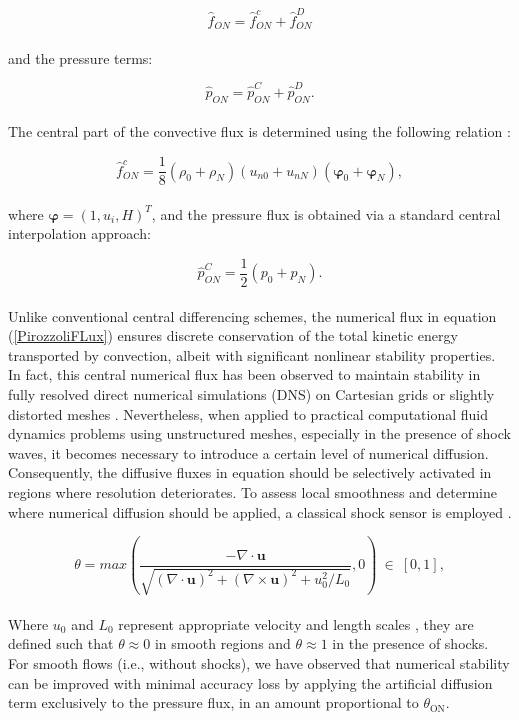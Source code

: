 \documentclass[a5paper]{sapthesis}
\begin{document}
	\begin{equation}
		\hat{f}_{ON} = \hat{f}^{c}_{ON} + \hat{f}^{D}_{ON}
		\label{convective_central_diffusive_fluxes}
	\end{equation}
	\\
	and the pressure terms:
	
	\begin{equation}
		\hat{p}_{ON} = \hat{p}^{C}_{ON} + \hat{p}^{D}_{ON}.
		\label{diffusive_central_diffusive_fluxes}
	\end{equation}
	\\
	The central part of the convective flux is determined using the following relation \cite{PIROZZOLI20107180}:
	
	\begin{equation}
		\hat{f}^{c}_{ON} = \frac{1}{8} (\rho_0 + \rho_N) (u_{n0} + u_{nN}) (\boldsymbol{\varphi}_0 + \boldsymbol{\varphi}_N),
		\label{PirozzoliFLux}
	\end{equation}
	\\
	where $\boldsymbol{\varphi} = (1, u_i, H)^T$, and the pressure flux is obtained via a standard central interpolation approach:
	
	\begin{equation}
		\hat{p}^{C}_{ON} = \frac{1}{2} (p_0 + p_N).
	\end{equation}
	\\
	Unlike conventional central differencing schemes, the numerical flux in equation (\ref{PirozzoliFLux}) ensures discrete conservation of the total kinetic energy transported by convection, albeit with significant nonlinear stability properties. In fact, this central numerical flux has been observed to maintain stability in fully resolved direct numerical simulations (DNS) on Cartesian grids or slightly distorted meshes \cite{PIROZZOLI20107180,PIROZZOLI20112997}. Nevertheless, when applied to practical computational fluid dynamics problems using unstructured meshes, especially in the presence of shock waves, it becomes necessary to introduce a certain level of numerical diffusion. Consequently, the diffusive fluxes in equation should be selectively activated in regions where resolution deteriorates. To assess local smoothness and determine where numerical diffusion should be applied, a classical shock sensor is employed \cite{DUCROS1999}.
	
	\begin{equation}
		\theta = max\left (\dfrac{-\nabla \cdot \mathbf{u}}{\sqrt{(\nabla \cdot \mathbf{u})^2 + (\nabla \times \mathbf{u})^2 + u_0^2/L_0}}, 0 \right ) \ \in \ [0,1],
	\end{equation}
	\\
	Where $u_0$ and $L_0$ represent appropriate velocity and length scales \cite{Pirozzoli2011}, they are defined such that $ \theta \approx 0 $ in smooth regions and $ \theta \approx 1 $ in the presence of shocks.  
	\\
	For smooth flows (i.e., without shocks), we have observed that numerical stability can be improved with minimal accuracy loss by applying the artificial diffusion term exclusively to the pressure flux, in an amount proportional to $ \theta_{\text{ON}} $. 
	
\end{document}
